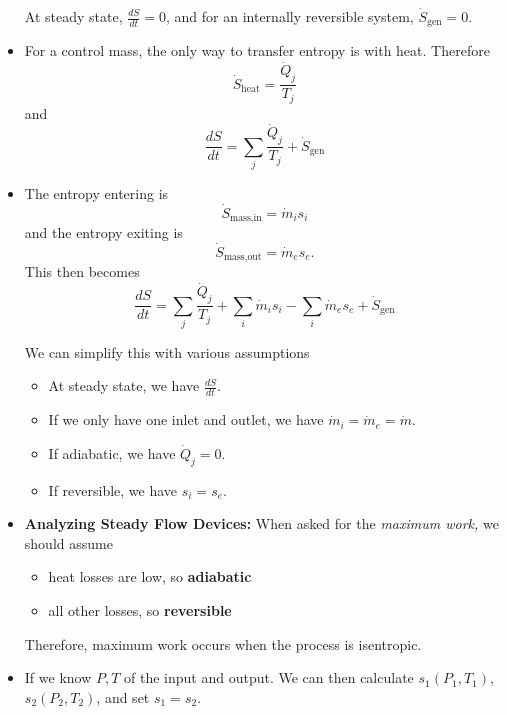 \begin{itemize}
    At steady state, $\frac{dS}{dt}=0$, and for an internally reversible system, $\dot{S}_\text{gen}=0$.
    \item For a control mass, the only way to transfer entropy is with heat. Therefore 
    \begin{equation}
        \dot{S}_\text{heat} = \frac{\dot{Q}_j}{T_j}
    \end{equation}
    and 
    \begin{equation}
        \frac{dS}{dt} = \sum_j \frac{\dot{Q}_j}{T_j}+\dot{S}_\text{gen}
    \end{equation}
    \item The entropy entering is 
    \begin{equation}
        \dot{S}_\text{mass,in}=\dot{m}_is_i
    \end{equation}
    and the entropy exiting is 
    \begin{equation}
        \dot{S}_\text{mass,out}=\dot{m}_es_e.
    \end{equation} 
    This then becomes 
    \begin{equation}
        \frac{dS}{dt} = \sum_j\frac{\dot{Q}_j}{T_j}+\sum_i \dot{m}_is_i - \sum_i \dot{m}_es_e + \dot{S}_\text{gen}
    \end{equation}
    \begin{idea}
        We can simplify this with various assumptions
        \begin{itemize}
            \item At steady state, we have $\frac{dS}{dt}.$
            \item If we only have one inlet and outlet, we have $\dot{m}_i=\dot{m}_e=\dot{m}$.
            \item If adiabatic, we have $\dot{Q}_j=0$.
            \item If reversible, we have $s_i=s_e$.
        \end{itemize}
    \end{idea}
    \item \textbf{Analyzing Steady Flow Devices:} When asked for the \textit{maximum work,} we should assume 
    \begin{itemize}
        \item heat losses are low, so \textbf{adiabatic}
        \item all other losses, so \textbf{reversible}
    \end{itemize}
    Therefore, maximum work occurs when the process is isentropic.
    \item If we know $P,T$ of the input and output. We can then calculate $s_1(P_1,T_1)$, $s_2(P_2,T_2)$, and set $s_1=s_2$.

\end{itemize}
